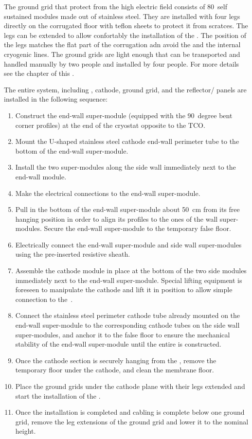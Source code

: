 The ground grid that protect  from the high electric field consists of 80~self sustained modules made out of stainless steel.
They are installed with four legs directly on the corrugated floor with teflon sheets to protect it from scratces.
The legs can be extended to allow confortably the installation of the .
The position of the legs matches the flat part of the corrugation adn avoid the  and the internal cryogenic lines.
The ground grids are light enough that can be transported and handled manually by two people and installed by four people.
For more details see the  chapter of this .

The entire  system, including , cathode, ground grid, and the reflector/ panels are installed in the following sequence:
\begin{enumerate}
\item Construct the end-wall super-module (equipped with the 90~degree bent corner profiles) at the end of the cryostat opposite to the TCO.
\item Mount the U-shaped stainless steel cathode end-wall perimeter tube to the bottom of the end-wall super-module.
\item Install the two super-modules along the side wall immediately next to the end-wall module.
\item Make the electrical connections to the end-wall super-module.
\item Pull in the bottom of the end-wall super-module about 50~cm from its free hanging position in order to align its profiles to the ones of the wall  super-modules. Secure the end-wall super-module to the temporary false floor.
\item Electrically connect the end-wall super-module and side wall super-modules using the pre-inserted resistive sheath.
\item Assemble the cathode module in place at the bottom of the two side  modules immediately next to the end-wall super-module.
Special lifting equipment is foreseen to manipulate the cathode and lift it in position to allow simple connection to the~.
\item Connect the stainless steel perimeter cathode tube already mounted on the end-wall super-module to the corresponding cathode tubes on the side wall super-modules, and anchor it to the false floor to ensure the mechanical stability of the end-wall super-module until the entire  is constructed.
\item Once the cathode section is securely hanging from the , remove the temporary floor under the cathode, and clean the membrane floor.
\item Place the ground grids under the cathode plane with their legs extended and start the installation of the .
\item Once the  installation is completed and cabling is complete below one ground grid, remove the leg extensions of the ground grid and lower it to the nominal height.
\end{enumerate}

